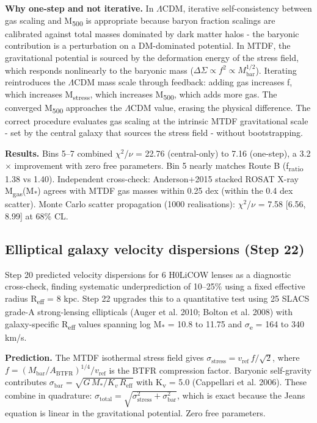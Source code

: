 \documentclass[11pt,a4paper]{article}
\begin{document}
\textbf{Why one-step and not iterative.} In $\Lambda$CDM, iterative self-consistency between gas scaling and M\textsubscript{500} is appropriate because baryon fraction scalings are calibrated against total masses dominated by dark matter halos  -  the baryonic contribution is a perturbation on a DM-dominated potential. In MTDF, the gravitational potential is sourced by the deformation energy of the stress field, which responds nonlinearly to the baryonic mass (\(\Delta\Sigma \propto f^2 \propto M_{\mathrm{bar}}^{1/2}\)). Iterating reintroduces the $\Lambda$CDM mass scale through feedback: adding gas increases f, which increases M\textsubscript{stress}, which increases M\textsubscript{500}, which adds more gas. The converged M\textsubscript{500} approaches the $\Lambda$CDM value, erasing the physical difference. The correct procedure evaluates gas scaling at the intrinsic MTDF gravitational scale  -  set by the central galaxy that sources the stress field  -  without bootstrapping.

\textbf{Results.} Bins 5--7 combined $\chi$$^{2}$/$\nu$ = 22.76 (central-only) to 7.16 (one-step), a 3.2$\times$ improvement with zero free parameters. Bin 5 nearly matches Route B (f\textsubscript{ratio} 1.38 vs 1.40). Independent cross-check: Anderson+2015 stacked ROSAT X-ray M\textsubscript{gas}(M\textsubscript{*}) agrees with MTDF gas masses within 0.25 dex (within the 0.4 dex scatter). Monte Carlo scatter propagation (1000 realisations): $\chi$$^{2}$/$\nu$ = 7.58 [6.56, 8.99] at 68\% CL.

\subsection{Elliptical galaxy velocity dispersions (Step 22)}
Step 20 predicted velocity dispersions for 6 H0LiCOW lenses as a diagnostic cross-check, finding systematic underprediction of 10--25\% using a fixed effective radius R\textsubscript{eff} = 8 kpc. Step 22 upgrades this to a quantitative test using 25 SLACS grade-A strong-lensing ellipticals (Auger et al. 2010; Bolton et al. 2008) with galaxy-specific R\textsubscript{eff} values spanning log M\textsubscript{*} = 10.8 to 11.75 and $\sigma$\textsubscript{e} = 164 to 340 km/\allowbreak{}s.

\textbf{Prediction.} The MTDF isothermal stress field gives \(\sigma_{\mathrm{stress}} = v_{\mathrm{ref}}\,f / \sqrt{2}\), where \(f = (M_{\mathrm{bar}} / A_{\mathrm{BTFR}})^{1/4} / v_{\mathrm{ref}}\) is the BTFR compression factor. Baryonic self-gravity contributes \(\sigma_{\mathrm{bar}} = \sqrt{G\,M_* / K_v\,R_{\mathrm{eff}}}\) with K\textsubscript{v} = 5.0 (Cappellari et al. 2006). These combine in quadrature: \(\sigma_{\mathrm{total}} = \sqrt{\sigma_{\mathrm{stress}}^2 + \sigma_{\mathrm{bar}}^2}\), which is exact because the Jeans equation is linear in the gravitational potential. Zero free parameters.
\end{document}
